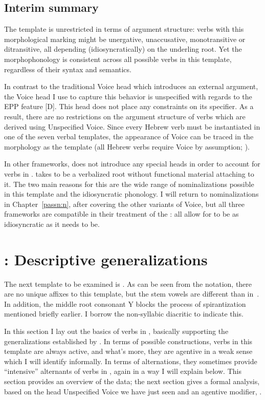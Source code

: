 {	\subsection{Interim summary} \label{voice:voice:sum}
The template {\tkal} is unrestricted in terms of argument structure: verbs with this morphological marking might be unergative, unaccusative, monotransitive or ditransitive, all depending (idiosyncratically) on the underling root. Yet the morphophonology is consistent across all possible verbs in this template, regardless of their syntax and semantics.

In contrast to the traditional Voice head which introduces an external argument, the Voice head I use to capture this behavior is unspecified with regards to the EPP feature [D]. This head does not place any constraints on its specifier. As a result, there are no restrictions on the argument structure of verbs which are derived using Unspecified Voice. Since every Hebrew verb must be instantiated in one of the seven verbal templates, the appearance of Voice can be traced in the morphology as the template {\tkal} (all Hebrew verbs require Voice by assumption; \citealt{arad05}).

In other frameworks, \cite{doron03} does not introduce any special heads in order to account for verbs in {\tkal}. \cite{borer13oup,borer15roots} takes {\tkal} to be a verbalized root without functional material attaching to it. The two main reasons for this are the wide range of nominalizations possible in this template and the idiosyncratic phonology. I will return to nominalizations in Chapter~\ref{passn:n}, after covering the other variants of Voice, but all three frameworks are compatible in their treatment of the {\tkal}: all allow for {\tkal} to be as idiosyncratic as it needs to be.

\section{\tpie: Descriptive generalizations} \label{voice:tpie}
The next template to be examined is {\tpie}. As can be seen from the notation, there are no unique affixes to this template, but the stem vowels are different than in~{\tkal}. In addition, the middle root consonant Y blocks the process of spirantization mentioned briefly earlier. I borrow the non-syllabic diacritic  to indicate this.

In this section I lay out the basics of verbs in {\tpie}, basically supporting the generalizations established by \cite{doron03}. In terms of possible constructions, verbs in this template are always active, and what's more, they are agentive in a weak sense which I will identify informally. In terms of alternations, they sometimes provide ``intensive'' alternants of verbs in {\tkal}, again in a way I will explain below. This section provides an overview of the data; the next section gives a formal analysis, based on the head Unspecified Voice we have just seen and an agentive modifier, {\va}.

}
